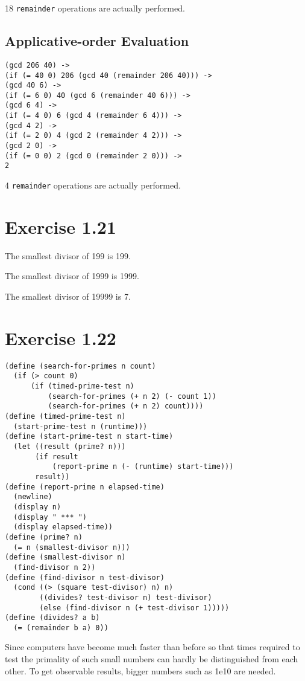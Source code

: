 \documentclass[../main.tex]{subfiles}
\begin{document}
18 \lstinline{remainder} operations are actually performed.

\subsection*{Applicative-order Evaluation}

\begin{lstlisting}
(gcd 206 40) ->
(if (= 40 0) 206 (gcd 40 (remainder 206 40))) ->
(gcd 40 6) ->
(if (= 6 0) 40 (gcd 6 (remainder 40 6))) ->
(gcd 6 4) ->
(if (= 4 0) 6 (gcd 4 (remainder 6 4))) ->
(gcd 4 2) ->
(if (= 2 0) 4 (gcd 2 (remainder 4 2))) ->
(gcd 2 0) ->
(if (= 0 0) 2 (gcd 0 (remainder 2 0))) ->
2
\end{lstlisting}

4 \lstinline{remainder} operations are actually performed.

\section{Exercise 1.21}

The smallest divisor of 199 is 199.

The smallest divisor of 1999 is 1999.

The smallest divisor of 19999 is 7.

\section{Exercise 1.22}

\begin{lstlisting}
(define (search-for-primes n count)
  (if (> count 0)
      (if (timed-prime-test n)
          (search-for-primes (+ n 2) (- count 1))
          (search-for-primes (+ n 2) count))))
(define (timed-prime-test n)
  (start-prime-test n (runtime)))
(define (start-prime-test n start-time)
  (let ((result (prime? n)))
       (if result
           (report-prime n (- (runtime) start-time)))
       result))
(define (report-prime n elapsed-time)
  (newline)
  (display n)
  (display " *** ")
  (display elapsed-time))
(define (prime? n)
  (= n (smallest-divisor n)))
(define (smallest-divisor n)
  (find-divisor n 2))
(define (find-divisor n test-divisor)
  (cond ((> (square test-divisor) n) n)
        ((divides? test-divisor n) test-divisor)
        (else (find-divisor n (+ test-divisor 1)))))
(define (divides? a b)
  (= (remainder b a) 0))
\end{lstlisting}

Since computers have become much faster than before so that
 times required to test the primality of such small numbers
 can hardly be distinguished from each other. To get observable
 results, bigger numbers such as 1e10 are needed.
\end{document}

